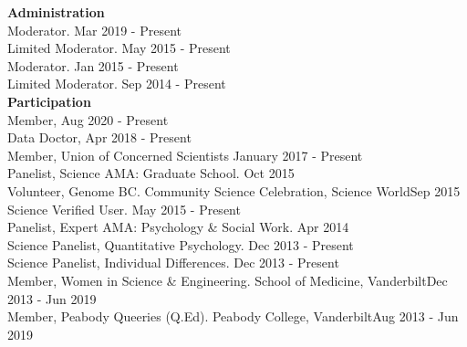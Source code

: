 {\large \textbf{Administration}}\\
Moderator. \hfill{Mar 2019 - Present}\smallskip\\
Limited Moderator. \hfill{May 2015 - Present}\smallskip\\
Moderator. \hfill{Jan 2015 - Present}\smallskip\\
Limited Moderator. \hfill{Sep 2014 - Present}\medskip\\
%
%
{\large \textbf{Participation}}\\
Member,  \hfill{Aug 2020 - Present}\smallskip\\
Data Doctor,  \hfill{Apr 2018 - Present}\smallskip\\
Member, Union of Concerned Scientists \hfill{January 2017 - Present}\smallskip\\
Panelist, Science AMA: Graduate School. \hfill{Oct 2015}\smallskip\\
Volunteer, Genome BC. Community Science Celebration, Science World\hfill{Sep 2015}\smallskip\\
Science Verified User. \hfill{May 2015 - Present}\smallskip\\
Panelist, Expert AMA: Psychology \& Social Work. \hfill{Apr 2014}\smallskip\\
Science Panelist, Quantitative Psychology. \hfill{Dec 2013 - Present}\smallskip\\%
Science Panelist, Individual Differences. \hfill{Dec 2013 - Present}\smallskip\\
Member, Women in Science \& Engineering. School of Medicine, Vanderbilt\hfill{Dec 2013 - Jun 2019}\smallskip\\
Member, Peabody Queeries (Q.Ed). Peabody College, Vanderbilt\hfill{Aug 2013 - Jun 2019}%
